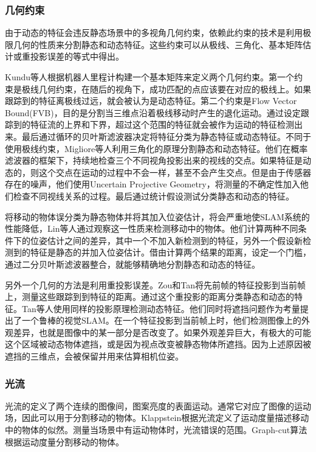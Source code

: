 \subsubsection{几何约束}
由于动态的特征会违反静态场景中的多视角几何约束，依赖此约束的技术是利用极限几何的性质来分割静态和动态特征。这些约束可以从极线、三角化、基本矩阵估计或重投影误差的等式中得出。

Kundu等人\cite{84}根据机器人里程计构建一个基本矩阵来定义两个几何约束。第一个约束是极线几何约束，在随后的视角下，成功匹配的点应该要在对应的极线上。如果跟踪到的特征离极线过远，就会被认为是动态特征。第二个约束是Flow Vector Bound(FVB)，目的是分割当三维点沿着极线移动时产生的退化运动。通过设定跟踪到的特征流的上界和下界，超过这个范围的特征就会被作为运动的特征检测出来。最后通过循环的贝叶斯滤波器决定将特征分类为静态特征或动态特征。不同于使用极线约束，Migliore等人\cite{104}利用三角化的原理分割静态和动态特征。他们在概率滤波器的框架下，持续地检查三个不同视角投影出来的视线的交点。如果特征是动态的，则这个交点在运动的过程中不会一样，甚至不会产生交点。但是由于传感器存在的噪声，他们使用Uncertain Projective Geometry\cite{61}，将测量的不确定性加入他们检查不同视线关系的过程。最后通过统计假设测试分类静态和动态的特征。

将移动的物体误分类为静态物体并将其加入位姿估计，将会严重地使SLAM系统的性能降低，Lin等人\cite{95}通过观察这一性质来检测移动中的物体。他们计算两种不同条件下的位姿估计之间的差异，其中一个不加入新检测到的特征，另外一个假设新检测到的特征是静态的并加入位姿估计。借由计算两个结果的距离，设定一个门槛，通过二分贝叶斯滤波器整合，就能够精确地分割静态和动态的特征。

另外一个几何的方法是利用重投影误差。Zou和Tan\cite{28}将先前帧的特征投影到当前帧上，测量这些跟踪到到特征的距离。通过这个重投影的距离分类静态和动态的特征。Tan等人\cite{152}使用同样的投影原理检测动态特征。他们同时将遮挡问题作为考量提出了一个鲁棒的视觉SLAM。在一个特征投影到当前帧上时，他们检测图像上的外观差异，也就是图像中的某一部分是否改变了。如果外观差异巨大，有极大的可能这个区域被动态物体遮挡，或是因为视点改变被静态物体所遮挡。因为上述原因被遮挡的三维点，会被保留并用来估算相机位姿。

\subsubsection{光流}
光流的定义了两个连续的图像间，图案亮度的表面运动。通常它对应了图像的运动场，因此可以用于分割移动的物体。Klappstein\cite{74}根据光流定义了运动度量描述移动中的物体的似然。测量当场景中有运动物体时，光流错误的范围。Graph-cut算法根据运动度量分割移动的物体。

